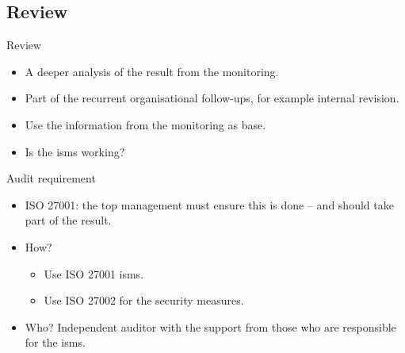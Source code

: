 \documentclass{beamer}
\begin{document}
\subsection{Review}
\begin{frame}{Review}
  \begin{itemize}
    \item A deeper analysis of the result from the monitoring.
    \item Part of the recurrent organisational follow-ups, for example internal
      revision.
    \item Use the information from the monitoring as base.
    \item Is the \ac{isms} working\@?
  \end{itemize}
\end{frame}
\begin{frame}{Audit requirement}
  \begin{itemize}
    \item ISO 27001: the top management must ensure this is done -- and should
      take part of the result.
    \item How?
      \begin{itemize}
        \item Use ISO 27001 \ac{isms}\@.
        \item Use ISO 27002 for the security measures.
      \end{itemize}
    \item Who?
      Independent auditor with the support from those who are responsible for
      the \ac{isms}.
  \end{itemize}
\end{frame}
\end{document}
